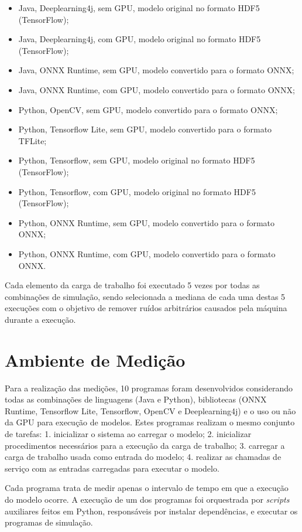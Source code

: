 \begin{itemize}
  \item Java, Deeplearning4j, sem GPU, modelo original no formato HDF5 (TensorFlow);
  \item Java, Deeplearning4j, com GPU, modelo original no formato HDF5 (TensorFlow);
  \item Java, ONNX Runtime, sem GPU, modelo convertido para o formato ONNX;
  \item Java, ONNX Runtime, com GPU, modelo convertido para o formato ONNX;
  \item Python, OpenCV, sem GPU, modelo convertido para o formato ONNX;
  \item Python, Tensorflow Lite, sem GPU, modelo convertido para o formato TFLite;
  \item Python, Tensorflow, sem GPU, modelo original no formato HDF5 (TensorFlow);
  \item Python, Tensorflow, com GPU, modelo original no formato HDF5 (TensorFlow);
  \item Python, ONNX Runtime, sem GPU, modelo convertido para o formato ONNX;
  \item Python, ONNX Runtime, com GPU, modelo convertido para o formato ONNX.
\end{itemize}

Cada elemento da carga de trabalho foi executado 5 vezes por todas as combinações de simulação, sendo selecionada a mediana de cada uma destas 5 execuções com o objetivo de remover ruídos arbitrários causados pela máquina durante a execução.

\section{Ambiente de Medição}

Para a realização das medições, 10 programas foram desenvolvidos considerando todas as combinações de linguagens (Java e Python), bibliotecas (ONNX Runtime, Tensorflow Lite, Tensorflow, OpenCV e Deeplearning4j) e o uso ou não da GPU para execução de modelos. Estes programas realizam o mesmo conjunto de tarefas: 1. inicializar o sistema ao carregar o modelo; 2. inicializar procedimentos necessários para a execução da carga de trabalho; 3. carregar a carga de trabalho usada como entrada do modelo; 4. realizar as chamadas de serviço com as entradas carregadas para executar o modelo.

Cada programa trata de medir apenas o intervalo de tempo em que a execução do modelo ocorre. A execução de um dos programas foi orquestrada por \textit{scripts} auxiliares feitos em Python, responsáveis por instalar dependências, e executar os programas de simulação.

